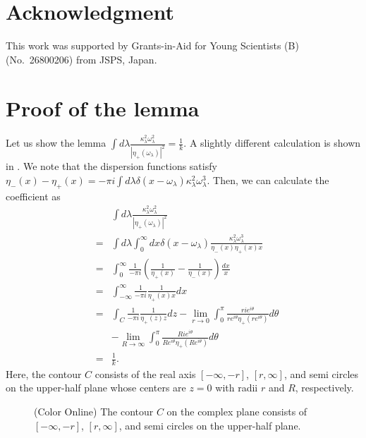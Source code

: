 \documentclass[aps,pre,twocolumn,eqsecnum,showpacs,superscriptaddress]{revtex4}
\begin{document}
\section*{Acknowledgment}
This work was supported by Grants-in-Aid for Young Scientists (B) (No.\ 26800206) from JSPS, Japan. 
\appendix
\section{Proof of the lemma}
Let us show the lemma $\int d\lambda\frac{\kappa_\lambda^2\omega_\lambda^2}{|\eta_+(\omega_\lambda)|^2}=\frac{1}{k}$.
A slightly different calculation is shown in \cite{Monnai2}.
We note that the dispersion functions satisfy $\eta_-(x)-\eta_+(x)=-\pi i\int d\lambda\delta(x-\omega_\lambda)\kappa_\lambda^2\omega_\lambda^3$. 
Then, we can calculate the coefficient as
\begin{eqnarray}
&&\int d\lambda\frac{\kappa_\lambda^2\omega_\lambda^2}{|\eta_+(\omega_\lambda)|^2} \nonumber \\
&=&\int d\lambda\int_0^\infty dx\delta(x-\omega_\lambda)\frac{\kappa_\lambda^2\omega_\lambda^3}{\eta_-(x)\eta_+(x)x} \nonumber \\
&=&\int_0^\infty\frac{1}{-\pi i}(\frac{1}{\eta_+(x)}-\frac{1}{\eta_-(x)})\frac{dx}{x} \nonumber \\
&=&\int_{-\infty}^\infty\frac{1}{-\pi i}\frac{1}{\eta_+(x)x}dx \nonumber \\
&=&\int_C\frac{1}{-\pi i}\frac{1}{\eta_+(z)z}dz-\lim_{r\rightarrow 0}\int_0^\pi\frac{ri e^{i\theta}}{re^{i\theta}\eta_+(re^{i\theta})}d\theta \nonumber \\
&&-\lim_{R\rightarrow\infty}\int_0^\pi\frac{Ri e^{i\theta}}{Re^{i\theta}\eta_+(Re^{i\theta})}d\theta \nonumber \\
&=&\frac{1}{k}. \label{coefficient1}
\end{eqnarray}
Here, the contour $C$ consists of the real axis $[-\infty,-r]$, $[r,\infty]$, and semi circles on the upper-half plane whose centers are $z=0$ with radii $r$ and $R$,  respectively. 
\begin{figure}
\caption{(Color Online) The contour $C$ on the complex plane consists of $[-\infty,-r]$, $[r,\infty]$, and semi circles on the upper-half plane.}
\end{figure}
\end{document}
